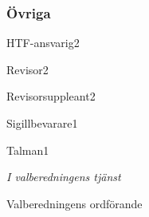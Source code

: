 \documentclass[10pt]{article}
\begin{document}
    
    \subsubsection{Övriga}
    \begin{vallista}
        \begin{post}{HTF-ansvarig}{2}
        \end{post}

        \begin{post}{Revisor}{2}
        \end{post}

        \begin{post}{Revisorsuppleant}{2}
        \end{post}

        \begin{post}{Sigillbevarare}{1}
        \end{post}

        \begin{post}{Talman}{1}
        \end{post}
    \end{vallista}

    \begin{signatures}{1}
        \emph{I valberedningens tjänst}
        \signature{Pontus Landgren}{Valberedningens ordförande}
    \end{signatures}
    
    
\end{document}
